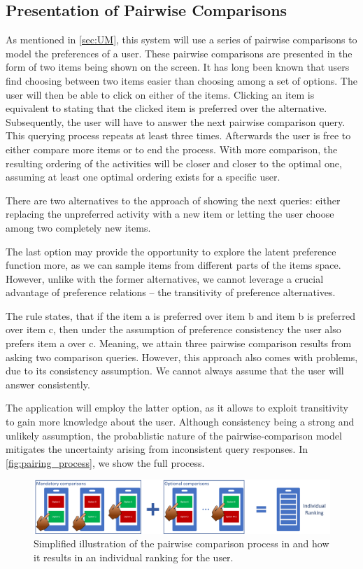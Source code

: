 \documentclass[11pt,a4paper,oneside]{article}
\begin{document}
\subsection{Presentation of Pairwise Comparisons}
As mentioned in \autoref{sec:UM}, this system will use a series of pairwise comparisons to model the preferences of a user. These pairwise comparisons are presented in the form of two items being shown on the screen. It has long been known that users find choosing between two items easier than choosing among a set of options. The user will then be able to click on either of the items. Clicking an item is equivalent to stating that the clicked item is preferred over the alternative. Subsequently, the user will have to answer the next pairwise comparison query. This querying process repeats at least three times. Afterwards the user is free to either compare more items or to end the process. With more comparison, the resulting ordering of the activities will be closer and closer to the optimal one, assuming at least one optimal ordering exists for a specific user.

There are two alternatives to the approach of showing the next queries: either replacing the unpreferred activity with a new item or letting the user choose among two completely new items. 

The last option may provide the opportunity to explore the latent preference function more, as we can sample items from different parts of the items space. However, unlike with the former alternatives, we cannot leverage a crucial advantage of preference relations -- the transitivity of preference alternatives.

The rule states, that if the item a is preferred over item b and item b is preferred over item c, then under the assumption of preference consistency the user also prefers item a over c. Meaning, we attain three pairwise comparison results from asking two comparison queries. However, this approach also comes with problems, due to its consistency assumption. We cannot always assume that the user will answer consistently.

The application will employ the latter option, as it allows to exploit transitivity to gain more knowledge about the user. Although consistency being a strong and unlikely assumption, the probablistic nature of the pairwise-comparison model mitigates the uncertainty arising from inconsistent query responses.
In \autoref{fig:pairing_process}, we show the full process.
\begin{figure}[H]
    \centering
    \includegraphics[width=\textwidth]{paper/imgs/pairwise_comparisons.png}
    \caption{Simplified illustration of the pairwise comparison process in and how it results in an individual ranking for the user.}
    \label{fig:pairing_process}
\end{figure}
\end{document}
